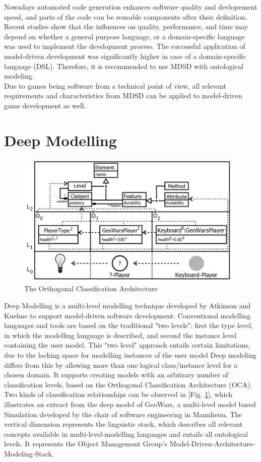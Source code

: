 Nowadays automated code generation enhances software quality and devlopement speed, and parts of the code can be reusable components after their definition.
Recent studies show that the influences on quality, performance, and time may depend on whether a general purpose language, or a domain-specific language was used to implement the development process. The successful application of model-driven development was significantly higher in case of a domain-specific language (DSL)\cite{whittle2014state}. Therefore, it is recommended to use MDSD with ontological modeling.\\
Due to games being software from a technical point of view, all relevant requirements and characteristics from MDSD can be applied to model-driven game development as well.
\section{Deep Modelling}
\begin{figure}
	\centering
	\includegraphics[scale=0.25]{grafiken/OCA.jpg} 
	\caption{The Orthogonal Classification Architecture\cite{exe2015}}
	\label{fig:1}
\end{figure}
Deep Modelling is a multi-level modelling technique developed by Atkinson and Kuehne to support model-driven software development. Conventional modelling languages and tools are based on the traditional "two levels": first the type level, in which the modelling language is described, and second the instance level containing the user model. This "two level" approach entails certain limitations, due to the lacking space for modelling instances of the user model \cite{AtkinsonG16} Deep modeling differs from this by allowing more than one logical class/instance level for a chosen domain. It supports creating models with an arbitrary number of classification levels, based on the Orthogonal Classification Architecture (OCA). Two kinds of classification relationships can be observed in [Fig. \ref{fig:1}], which illustrates an extract from the deep model of GeoWars, a multi-level model based Simulation developed by the chair of software engineering in Mannheim. The vertical dimension represents the linguistic stack, which describes all relevant concepts available in multi-level-modelling languages and entails all ontological levels. It represents the Object Management Group's Model-Driven-Architecture-Modeling-Stack\cite{AtkinsonG16}. 
